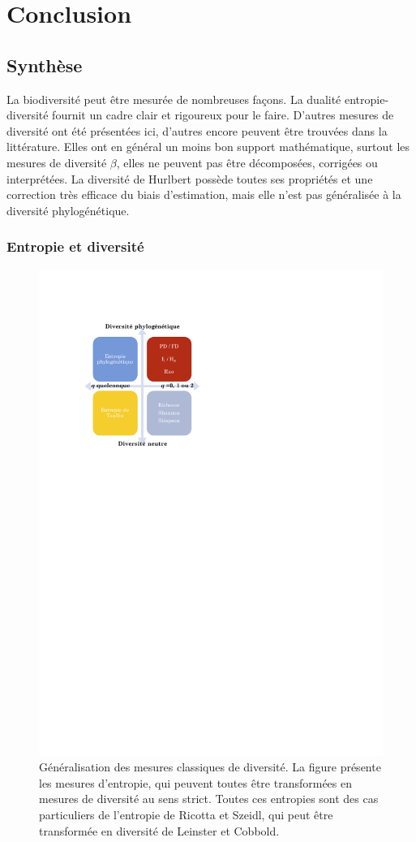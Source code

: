 \documentclass[
  11pt,
  french,
  a4paper,
  extrafontsizes,onecolumn,openright
  ]{memoir}
\begin{document}
\hypertarget{part-conclusion}{%
\part{Conclusion}\label{part-conclusion}}

\hypertarget{sec-conclusionSynthese}{%
\chapter{Synthèse}\label{sec-conclusionSynthese}}

La biodiversité peut être mesurée de nombreuses façons.
La dualité entropie-diversité fournit un cadre clair et rigoureux pour le faire.
D'autres mesures de diversité ont été présentées ici, d'autres encore peuvent être trouvées dans la littérature.
Elles ont en général un moins bon support mathématique, surtout les mesures de diversité \(\beta\), elles ne peuvent pas être décomposées, corrigées ou interprétées.
La diversité de Hurlbert possède toutes ses propriétés et une correction très efficace du biais d'estimation, mais elle n'est pas généralisée à la diversité phylogénétique.

\hypertarget{entropie-et-diversituxe9-1}{%
\section{Entropie et diversité}\label{entropie-et-diversituxe9-1}}



\scriptsize

\begin{figure}

{\centering \includegraphics[width=0.6\linewidth]{images/ConclusionFig} 

}

\caption{Généralisation des mesures classiques de diversité. La figure présente les mesures d'entropie, qui peuvent toutes être transformées en mesures de diversité au sens strict. Toutes ces entropies sont des cas particuliers de l'entropie de Ricotta et Szeidl, qui peut être transformée en diversité de Leinster et Cobbold.}\label{fig:ConclusionFig}
\end{figure}
\end{document}
